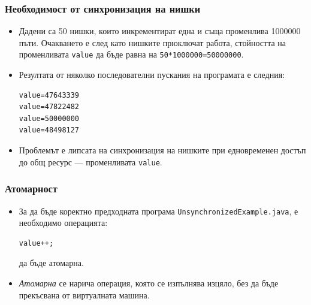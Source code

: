 \documentclass[ignorenonframetext, hyperref=unicode,compress]{beamer}
\begin{document}
\begin{frame}[containsverbatim,shrink=5]

\end{frame}

\begin{frame}[containsverbatim,shrink=5]
\frametitle{Необходимост от синхронизация на нишки}
\begin{itemize}
\item Дадени са 50 нишки, които инкрементират една и съща променлива 1000000
пъти. Очакването е след като нишките прюключат работа, стойността на
променливата \lstinline{value} да бъде равна на \lstinline{50*1000000=50000000}.
\item Резултата от няколко последователни пускания на програмата е следния:
\begin{verbatim}
value=47643339
value=47822482
value=50000000
value=48498127
\end{verbatim}
\item Проблемът е липсата на синхронизация на нишките при едновременен достъп
до общ ресурс --- променливата \lstinline{value}.
\end{itemize}
\end{frame}

\begin{frame}[containsverbatim]
\frametitle{Атомарност}
\begin{itemize}
\item За да бъде коректно предходната програма
\lstinline{UnsynchronizedExample.java}, е необходимо операцията:
\begin{lstlisting}[numbers=none] 
value++;
\end{lstlisting}
да бъде атомарна.
\item {\em Атомарна} се нарича операция, която се изпълнява изцяло, без да бъде
прекъсвана от виртуалната машина.
\end{itemize}
\end{frame}
\end{document}

